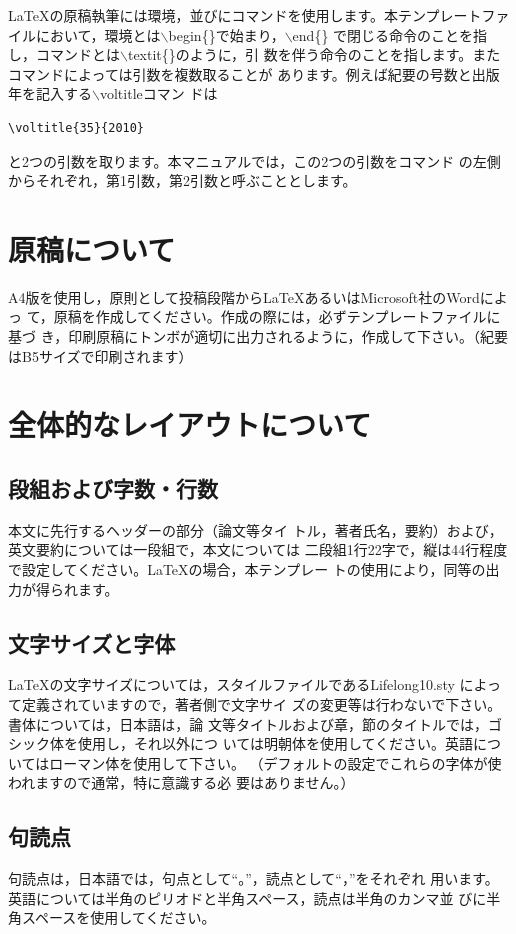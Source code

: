 \documentclass[b5paper,10pt,twocolumn,tombow]{jarticle}
\begin{document}
\LaTeX{}の原稿執筆には環境，並びにコマンドを使用します。本テンプレートファ
イルにおいて，環境とは$\backslash$begin\{\}で始まり，$\backslash$end\{\}
で閉じる命令のことを指し，コマンドとは$\backslash$textit\{\}のように，引
数を伴う命令のことを指します。またコマンドによっては引数を複数取ることが
あります。例えば紀要の号数と出版年を記入する$\backslash$voltitleコマン
ドは
\begin{verbatim}
\voltitle{35}{2010}
\end{verbatim}
と2つの引数を取ります。本マニュアルでは，この2つの引数をコマンド
の左側からそれぞれ，第1引数，第2引数と呼ぶこととします。

\section{原稿について}
A4版を使用し，原則として投稿段階から\LaTeX{}あるいはMicrosoft社のWordによっ
て，原稿を作成してください。作成の際には，必ずテンプレートファイルに基づ
き，印刷原稿にトンボが適切に出力されるように，作成して下さい。（紀要
はB5サイズで印刷されます）

\section{全体的なレイアウトについて}
\subsection{段組および字数・行数}

本文に先行するヘッダーの部分（論文等タイ
トル，著者氏名，要約）および，英文要約については一段組で，本文については
二段組1行22字で，縦は44行程度で設定してください。\LaTeX{}の場合，本テンプレー
トの使用により，同等の出力が得られます。


\subsection{文字サイズと字体}
\LaTeX{}の文字サイズについては，スタイルファイルであるLifelong10.sty
によって定義されていますので，著者側で文字サイ
ズの変更等は行わないで下さい。書体については，日本語は，論
文等タイトルおよび章，節のタイトルでは，ゴシック体を使用し，それ以外につ
いては明朝体を使用してください。英語についてはローマン体を使用して下さい。
（デフォルトの設定でこれらの字体が使われますので通常，特に意識する必
要はありません。）

\subsection{句読点}
句読点は，日本語では，句点として``。''，読点として``，''をそれぞれ
用います。英語については半角のピリオドと半角スペース，読点は半角のカンマ並
びに半角スペースを使用してください。
\end{document}
